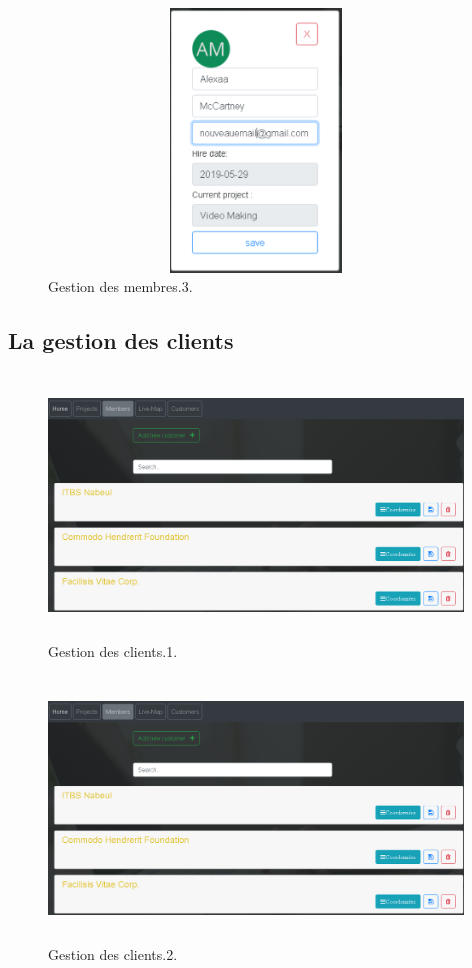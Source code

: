 \FloatBarrier
\begin{figure}[H]
\center
\includegraphics[width=11cm,height=7cm]{./figures/pres/mm3.png}
\caption{Gestion des membres.3.}
\end{figure}
\FloatBarrier



\subsection{La gestion des clients}
\FloatBarrier
\begin{figure}[H]
\center
\includegraphics[width=11cm,height=7cm]{./figures/pres/cc1.png}
\caption{Gestion des clients.1.}
\end{figure}
\FloatBarrier


\FloatBarrier
\begin{figure}[H]
\center
\includegraphics[width=11cm,height=7cm]{./figures/pres/cc1.png}
\caption{Gestion des clients.2.}
\end{figure}
\FloatBarrier



